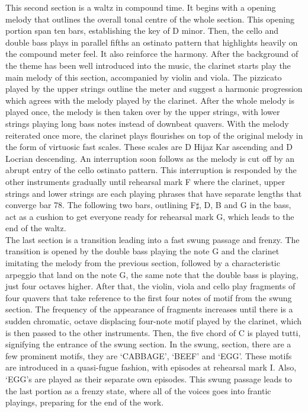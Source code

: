 \documentclass{article}
\begin{document}
This second section is a waltz in compound time. It begins with a opening
melody that outlines the overall tonal centre of the whole section. This
opening portion span ten bars, establishing the key of D minor. Then, the cello
and double bass plays in parallel fifths an ostinato pattern that highlights
heavily on the compound meter feel. It also reinforce the harmony. After the
background of the theme has been well introduced into the music, the clarinet
starts play the main melody of this section, accompanied by violin and viola.
The pizzicato played by the upper strings outline the meter and suggest a
harmonic progression which agrees with the melody played by the clarinet. After
the whole melody is played once, the melody is then taken over by the upper
strings, with lower strings playing long bass notes instead of downbeat
quavers. With the melody reiterated once more, the clarinet plays flourishes on
top of the original melody in the form of virtuosic fast scales. These scales
are D Hijaz Kar ascending and D Locrian descending. An interruption soon
follows as the melody is cut off by an abrupt entry of the cello ostinato
pattern. This interruption is responded by the other instruments gradually
until rehearsal mark F where the clarinet, upper strings and lower strings are
each playing phrases that have separate lengths that converge bar 78. The
following two bars, outlining F\(\sharp\), D, B and G in the bass, act as a
cushion to get everyone ready for rehearsal mark G, which leads to the end of
the waltz.\\

The last section is a transition leading into a fast swung passage and frenzy.
The transition is opened by the double bass playing the note G and the clarinet
imitating the melody from the previous section, followed by a characteristic
arpeggio that land on the note G, the same note that the double bass is
playing, just four octaves higher. After that, the violin, viola and cello play
fragments of four quavers that take reference to the first four notes of motif
from the swung section.  The frequency of the appearance of fragments increases
until there is a sudden chromatic, octave displacing four-note motif played by
the clarinet, which is then passed to the other instruments. Then, the five
chord of C is played tutti, signifying the entrance of the swung section. In
the swung, section, there are a few prominent motifs, they are `CABBAGE',
`BEEF' and `EGG'. These motifs are introduced in a quasi-fugue fashion, with
episodes at rehearsal mark I. Also, `EGG's are played as their separate own
episodes. This swung passage leads to the last portion as a frenzy state,
where all of the voices goes into frantic playings, preparing for the end of
the work.
\end{document}
